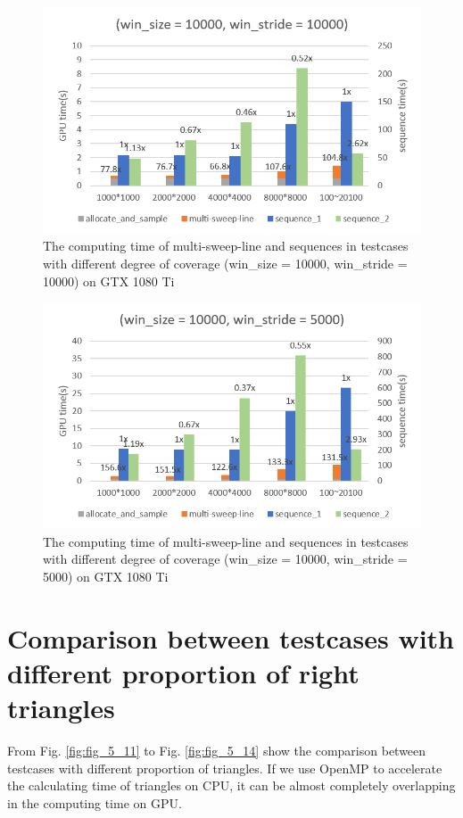 \begin{figure}[!h]
    \centering
    \includegraphics[scale=0.7]{image/fig_5_9}
    \caption{The computing time of multi-sweep-line and sequences in testcases with different degree of coverage (win\_size = 10000, win\_stride = 10000) on GTX 1080 Ti}
    \label{fig:fig_5_9}
\end{figure}

\begin{figure}[!h]
    \centering
    \includegraphics[scale=0.7]{image/fig_5_10}
    \caption{The computing time of multi-sweep-line and sequences in testcases with different degree of coverage (win\_size = 10000, win\_stride = 5000) on GTX 1080 Ti}
    \label{fig:fig_5_10}
\end{figure}

\section{Comparison between testcases with different proportion of right triangles}
From Fig. \ref{fig:fig_5_11} to Fig. \ref{fig:fig_5_14} show the comparison between testcases with different proportion of triangles. If we use OpenMP to accelerate the calculating time of triangles on CPU, it can be almost completely overlapping in the computing time on GPU.

